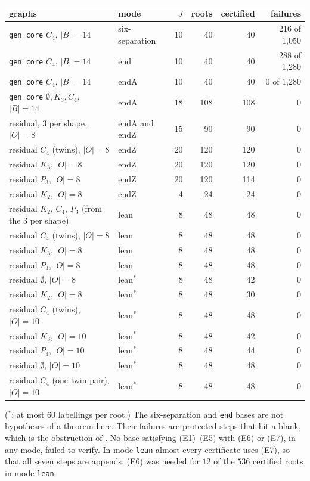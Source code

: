 \documentclass[11pt]{amsart}
\theoremstyle{definition}
\begin{document}
\begin{center}\footnotesize
\begin{tabular}{@{}llrrrr@{}}
\toprule
graphs & mode & $J$ & roots & certified & failures\\
\midrule
\texttt{gen\_core} $C_4$, $|B|=14$ & six-separation & 10 & 40 & 40 & 216 of 1{,}050\\
\texttt{gen\_core} $C_4$, $|B|=14$ & end & 10 & 40 & 40 & 288 of 1{,}280\\
\texttt{gen\_core} $C_4$, $|B|=14$ & endA & 10 & 40 & 40 & 0 of 1{,}280\\
\texttt{gen\_core} $\emptyset,K_3,C_4$, $|B|=14$ & endA & 18 & 108 & 108 & 0\\
residual, 3 per shape, $|O|=8$ & endA and endZ & 15 & 90 & 90 & 0\\
residual $C_4$ (twins), $|O|=8$ & endZ & 20 & 120 & 120 & 0\\
residual $K_3$, $|O|=8$ & endZ & 20 & 120 & 120 & 0\\
residual $P_3$, $|O|=8$ & endZ & 20 & 120 & 114 & 0\\
residual $K_2$, $|O|=8$ & endZ & 4 & 24 & 24 & 0\\
residual $K_2$, $C_4$, $P_3$ (from the 3 per shape) & lean & 8 & 48 & 48 & 0\\
residual $C_4$ (twins), $|O|=8$ & lean & 8 & 48 & 48 & 0\\
residual $K_3$, $|O|=8$ & lean & 8 & 48 & 48 & 0\\
residual $P_3$, $|O|=8$ & lean & 8 & 48 & 48 & 0\\
residual $\emptyset$, $|O|=8$ & lean${}^*$ & 8 & 48 & 42 & 0\\
residual $K_2$, $|O|=8$ & lean${}^*$ & 8 & 48 & 30 & 0\\
residual $C_4$ (twins), $|O|=10$ & lean${}^*$ & 8 & 48 & 48 & 0\\
residual $K_3$, $|O|=10$ & lean${}^*$ & 8 & 48 & 42 & 0\\
residual $P_3$, $|O|=10$ & lean${}^*$ & 8 & 48 & 44 & 0\\
residual $\emptyset$, $|O|=10$ & lean${}^*$ & 8 & 48 & 48 & 0\\
residual $C_4$ (one twin pair), $|O|=10$ & lean${}^*$ & 8 & 48 & 48 & 0\\
\bottomrule
\end{tabular}
\end{center}
(${}^*$: at most $60$ labellings per root.) The six-separation and \texttt{end} bases are not
hypotheses of a theorem here. Their failures are protected steps that hit a blank, which is the
obstruction of \cite[\S9(1)]{TM}. No base satisfying (E1)--(E5) with (E6) or (E7), in any mode,
failed to verify. In mode \texttt{lean} almost every certificate uses (E7), so that all seven
steps are appends. (E6) was needed for $12$ of the $536$ certified roots in mode \texttt{lean}.
\end{document}
